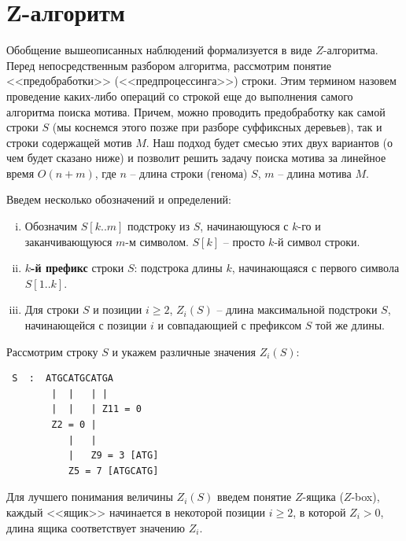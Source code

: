 \documentclass[letterpaper, 11pt]{article}
\begin{document}
\section{Z-алгоритм}
\par
Обобщение вышеописанных наблюдений формализуется в виде $Z$-алгоритма. Перед непосредственным разбором алгоритма, рассмотрим понятие <<предобработки>> (<<предпроцессинга>>) строки. Этим термином назовем проведение каких-либо операций со строкой еще до выполнения самого алгоритма поиска мотива. Причем, можно проводить предобработку как самой строки $S$ (мы коснемся этого позже при разборе суффиксных деревьев), так и строки содержащей мотив $M$. Наш подход будет смесью этих двух вариантов (о чем будет сказано ниже) и позволит решить задачу поиска мотива за линейное время $O(n + m)$, где $n$ -- длина строки (генома) $S$, $m$ -- длина мотива $M$.
\par
Введем несколько обозначений и определений:
\begin{enumerate}[(i)]
\item
Обозначим $S[k..m]$ подстроку из $S$, начинающуюся с $k$-го и заканчивающуюся $m$-м символом. $S[k]$ -- просто $k$-й символ строки.
\item
\textbf{$k$-й префикс} строки $S$: подстрока длины $k$, начинающаяся с первого символа $S[1..k]$.
\item
Для строки $S$ и позиции $i \geq 2$, $Z_i(S)$ -- длина максимальной подстроки $S$, начинающейся с позиции $i$ и совпадающией с префиксом $S$ той же длины.
\end{enumerate}
\par
Рассмотрим строку $S$ и укажем различные значения $Z_i(S)$:
\begin{verbatim}
 S  :  ATGCATGCATGA
        |  |   | |
        |  |   | Z11 = 0
        Z2 = 0 |
           |   |
           |   Z9 = 3 [ATG]
           Z5 = 7 [ATGCATG]
\end{verbatim}
\par
Для лучшего понимания величины $Z_i(S)$ введем понятие $Z$-ящика ($Z$-box), каждый <<ящик>> начинается в некоторой позиции $i \geq 2$, в которой $Z_i > 0$, длина ящика соответствует значению $Z_i$.
\end{document}
